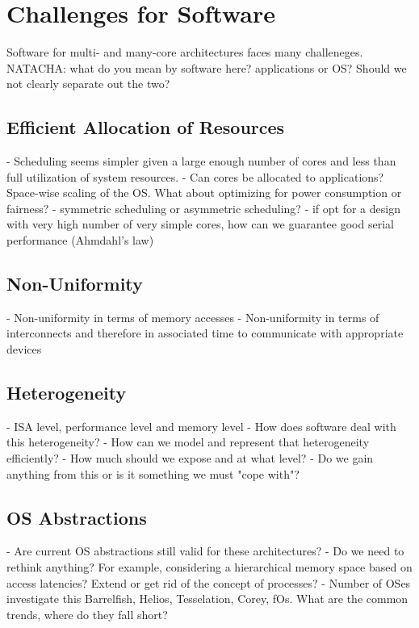 \section{Challenges for Software}
\label{sec:challenges}

Software for multi- and many-core architectures faces many challeneges.
NATACHA: what do you mean by software here? applications or OS? Should we not
clearly separate out the two?

\subsection{Efficient Allocation of Resources}

- Scheduling seems simpler given a large enough number of cores and less than
full utilization of system resources.
- Can cores be allocated to applications? Space-wise scaling of the OS. What
about optimizing for power consumption or fairness?
- symmetric scheduling  or asymmetric scheduling?
- if opt for a design with very high number of very simple cores, how can we
guarantee good serial performance (Ahmdahl's law)

\subsection{Non-Uniformity}
- Non-uniformity in terms of memory accesses
- Non-uniformity in terms of interconnects and therefore
in associated time to communicate with appropriate devices

\subsection{Heterogeneity}

- ISA level, performance level and memory level
- How does software deal with this heterogeneity?
- How can we model and represent that heterogeneity efficiently?
- How much should we expose and at what level?
- Do we gain anything from this or is it something we must "cope with"?

\subsection{OS Abstractions}

- Are current OS abstractions still valid for these architectures?
- Do we need to rethink anything? For example, considering a hierarchical memory
space based on access latencies? Extend or get rid of the concept of processes?
- Number of OSes investigate this Barrelfish, Helios, Tesselation, Corey, fOs. What
are the common trends, where do they fall short?

